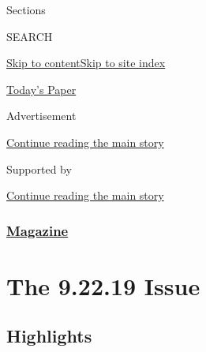 Sections

SEARCH

\protect\hyperlink{site-content}{Skip to
content}\protect\hyperlink{site-index}{Skip to site index}

\href{https://myaccount.nytimes3xbfgragh.onion/auth/login?response_type=cookie\&client_id=vi}{}

\href{https://www.nytimes3xbfgragh.onion/section/todayspaper}{Today's
Paper}

Advertisement

\protect\hyperlink{after-top}{Continue reading the main story}

Supported by

\protect\hyperlink{after-sponsor}{Continue reading the main story}

\hypertarget{magazine}{%
\subsubsection{\texorpdfstring{\href{/section/magazine}{Magazine}}{Magazine}}\label{magazine}}

\hypertarget{the-92219-issue}{%
\section{The 9.22.19 Issue}\label{the-92219-issue}}

\hypertarget{highlights}{%
\subsection{Highlights}\label{highlights}}

